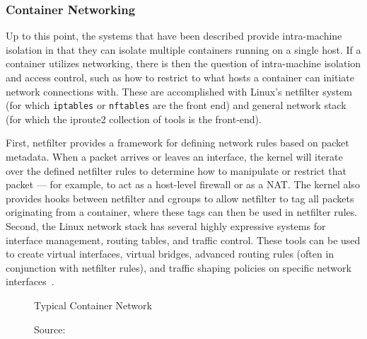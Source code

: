 \documentclass[12pt,titlepage]{article}
\begin{document}
\subsubsection{Container Networking}
Up to this point, the systems that have been described provide intra-machine isolation in that they can isolate multiple containers running on a single host.
If a container utilizes networking, there is then the question of intra-machine isolation and access control, such as how to restrict to what hosts a container can initiate network connections with.
These are accomplished with Linux's netfilter system (for which \texttt{iptables} or \texttt{nftables} are the front end) and general network stack (for which the iproute2 collection of tools is the front-end).

First, netfilter provides a framework for defining network rules based on packet metadata.
When a packet arrives or leaves an interface, the kernel will iterate over the defined netfilter rules to determine how to manipulate or restrict that packet --- for example, to act as a host-level firewall or as a NAT\@.
The kernel also provides hooks between netfilter and cgroups to allow netfilter to tag all packets originating from a container, where these tags can then be used in netfilter rules.
Second, the Linux network stack has several highly expressive systems for interface management, routing tables, and traffic control.
These tools can be used to create virtual interfaces, virtual bridges, advanced routing rules (often in conjunction with netfilter rules), and traffic shaping policies on specific network interfaces~\cite{iproute2wiki,netfilterhome}.

\begin{figure}
	\centering
	\caption{Typical Container Network}
	\caption*{Source:~\cite{dockercontainernetwork}}
\end{figure}
\end{document}
